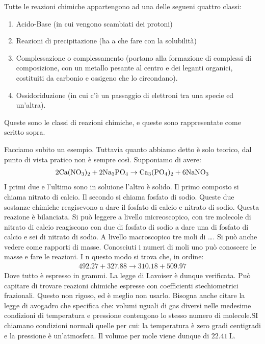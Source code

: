 \documentclass[../AppuntiChimica]{subfiles}
\begin{document}
	Tutte le reazioni chimiche appartengono ad una delle segueni quattro classi:
	\begin{enumerate}
		\item Acido-Base (in cui vengono scambiati dei protoni)
		\item Reazioni di precipitazione (ha a che fare con la solubilità)
		\item Complessazione o complessamento (portano alla formazione di complessi di composizione, con un metallo pesante al centro e dei leganti organici, costituiti da carbonio e ossigeno che lo circondano).
		\item Ossidoriduzione (in cui c'è un passaggio di elettroni tra una specie ed un'altra).
	\end{enumerate}
	Queste sono le classi di reazioni chimiche, e queste sono rappresentate come scritto sopra.
	
	Facciamo subito un esempio. Tuttavia quanto abbiamo detto è solo teorico, dal punto di vista pratico non è sempre così. Supponiamo di avere:
	\begin{gather*}
	2\text{Ca}(\text{N}\text{O}_{3})_{2}+2\text{Na}_{3}\text{P}\text{O}_{4}\to \text{Ca}_{3}(\text{P}\text{O}_{4})_{2}+6\text{Na}\text{N}\text{O}_{3}
	\end{gather*}
	I primi due e l'ultimo sono in soluione l'altro è solido. Il primo composto si chiama nitrato di calcio. Il secondo si chiama fosfato di sodio. Queste due sostanze chimiche reagiscvono a dare il fosfato di calcio e nitrato di sodio. Questa reazione è bilanciata. Si può leggere a livello micreoscopico, con tre molecole di nitrato di calcio reagiscono con due di fosfato di sodio a dare una di fosfato di calcio e sei di nitrato di sodio. A livello macroscopico tre moli di \dots. Si può anche vedere come rapporti di masse. Conosciuti i numeri di moli uno può conoscere le masse e fare le reazioni. I n questo modo si trova che, in ordine:
	\begin{gather*}
	492.27+327.88\to 310.18+509.97
	\end{gather*}
	Dove tutto è espresso in grammi. La legge di Lavoiser è dunque verificata. Può capitare di trovare reazioni chimiche espresse con coefficienti stechiometrici frazionali. Questo non  rigoso, ed è meglio non usarlo. Bisogna anche citare la legge di avogadro che specifica che: volumi uguali di gas diversi nelle medesime condizioni di temperatura e pressione contengono lo stesso numero di molecole.SI chiamano condizioni normali quelle per cui: la temperatura è zero gradi centigradi e la pressione è un'atmosfera. Il volume per mole viene dunque di $ \SI{22.41}{\liter} $.
	
\end{document}
